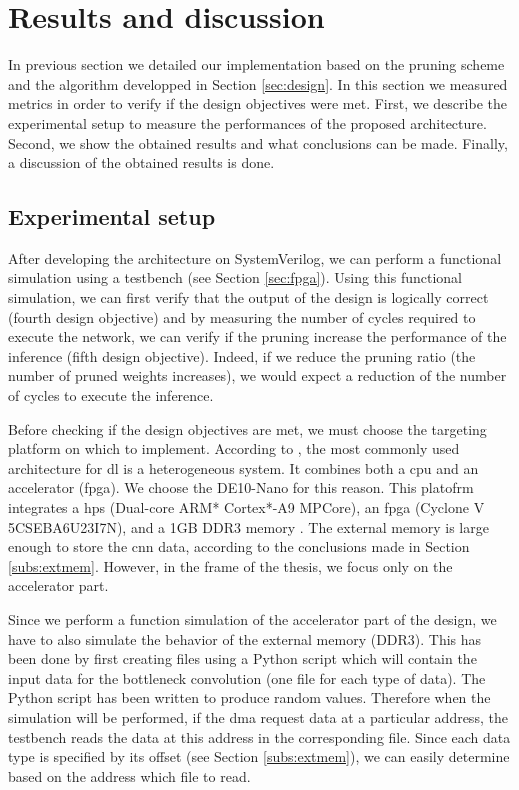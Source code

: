 \section{Results and discussion} \label{sec:measure}
In previous section we detailed our implementation based on the pruning scheme and the algorithm developped in Section \ref{sec:design}. In this section we measured metrics in order to verify if the design objectives were met.  First, we describe the experimental setup to measure the performances of the proposed architecture. Second, we show the obtained results and what conclusions can be made. Finally, a discussion of the obtained results is done.
%
\subsection{Experimental setup} \label{subs:exp_set}
%
After developing the architecture on SystemVerilog, we can perform a functional simulation using a testbench (see Section \ref{sec:fpga}). Using this functional simulation, we can first verify that the output of the design is logically correct (fourth design objective) and by measuring the number of cycles required to execute the network, we can verify if the pruning increase the performance of the inference (fifth design objective). Indeed, if we reduce the pruning ratio (the number of pruned weights increases), we would expect a reduction of the number of cycles to execute the inference.

Before checking if the design objectives are met, we must choose the targeting platform on which to implement. According to \textcite{liu_fpga-based_2019}, the most commonly used architecture for \acrshort{dl} is a heterogeneous system. It combines both a \acrshort{cpu} and an accelerator (\acrshort{fpga}). We choose the DE10-Nano for this reason. This platofrm integrates a \acrfull{hps} (Dual-core ARM* Cortex*-A9 MPCore), an \acrshort{fpga} (Cyclone V 5CSEBA6U23I7N), and a 1GB DDR3 memory \cite{technologies_terasic_nodate}. The external memory is large enough to store the \acrshort{cnn} data, according to the conclusions made in Section \ref{subs:extmem}. However, in the frame of the thesis, we focus only on the accelerator part.

Since we perform a function simulation of the accelerator part of the design, we have to also simulate the behavior of the external memory (DDR3). This has been done by first creating files using a Python script which will contain the input data for the bottleneck convolution (one file for each type of data). The Python script has been written to produce random values. Therefore when the simulation will be performed, if the \acrshort{dma} request data at a particular address, the testbench reads the data at this address in the corresponding file. Since each data type is specified by its offset (see Section \ref{subs:extmem}), we can easily determine based on the address which file to read.

